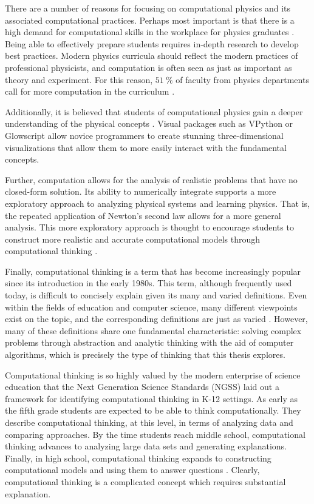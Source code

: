 \documentclass{msuphddissertation}
\begin{document}
\begin{doublespace}
There are a number of reasons for focusing on computational physics and its associated computational practices.  Perhaps most important is that there is a high demand for computational skills in the workplace for physics graduates \cite{AAPT2016}.  Being able to effectively prepare students requires in-depth research to develop best practices.  Modern physics curricula should reflect the modern practices of professional physicists, and computation is often seen as just as important as theory and experiment.  For this reason, $\SI{51}{\percent}$ of faculty from physics departments call for more computation in the curriculum \cite{Chonacky2008}.

Additionally, it is believed that students of computational physics gain a deeper understanding of the physical concepts \cite{Chabay2008,Kohlmyer2005}.  Visual packages such as VPython or Glowscript \cite{Sherer2000} allow novice programmers to create stunning three-dimensional visualizations that allow them to more easily interact with the fundamental concepts.

Further, computation allows for the analysis of realistic problems that have no closed-form solution.  Its ability to numerically integrate supports a more exploratory approach to analyzing physical systems and learning physics.  That is, the repeated application of Newton's second law allows for a more general analysis.  This more exploratory approach is thought to encourage students to construct more realistic and accurate computational models through computational thinking \cite{AAPT2016}.

Finally, computational thinking is a term that has become increasingly popular since its introduction in the early 1980s.  This term, although frequently used today, is difficult to concisely explain given its many and varied definitions.  Even within the fields of education and computer science, many different viewpoints exist on the topic, and the corresponding definitions are just as varied \cite{Grover2013}.  However, many of these definitions share one fundamental characteristic: solving complex problems through abstraction and analytic thinking with the aid of computer algorithms, which is precisely the type of thinking that this thesis explores.

Computational thinking is so highly valued by the modern enterprise of science education that the Next Generation Science Standards (NGSS) laid out a framework for identifying computational thinking in K-12 settings.  As early as the fifth grade students are expected to be able to think computationally.  They describe computational thinking, at this level, in terms of analyzing data and comparing approaches.  By the time students reach middle school, computational thinking advances to analyzing large data sets and generating explanations.  Finally, in high school, computational thinking expands to constructing computational models and using them to answer questions \cite{NGSS2012}.  Clearly, computational thinking is a complicated concept which requires substantial explanation.


\end{doublespace}
\end{document}

